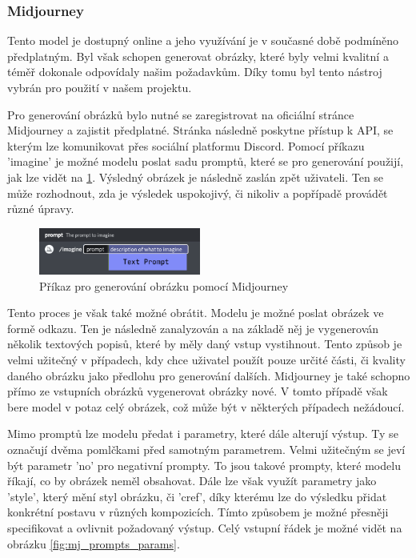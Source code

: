 \subsubsection*{Midjourney}
Tento model je dostupný online a jeho využívání je v současné době podmíněno předplatným. Byl však schopen generovat obrázky, které byly velmi kvalitní a téměř  dokonale odpovídaly našim požadavkům. Díky tomu byl tento nástroj vybrán pro použití v našem projektu.

Pro generování obrázků bylo nutné se zaregistrovat na oficiální stránce Midjourney a zajistit předplatné. Stránka následně poskytne přístup k API, se kterým lze komunikovat přes sociální platformu Discord. Pomocí příkazu 'imagine' je možné modelu poslat sadu promptů, které se pro generování použijí, jak lze vidět na \ref{fig:mj_prompts}. Výsledný obrázek je následně zaslán zpět uživateli. Ten se může rozhodnout, zda je výsledek uspokojivý, či nikoliv a popřípadě provádět různé úpravy.

\begin{figure}[H]
    \centering
    \includegraphics[width=0.475\textwidth]{resources/figures/midjourney_prompts.png}
    \caption{Příkaz pro generování obrázku pomocí Midjourney\cite{midjourney}}
    \label{fig:mj_prompts}
\end{figure}

Tento proces je však také možné obrátit. Modelu je možné poslat obrázek ve formě odkazu. Ten je následně zanalyzován a na základě něj je vygenerován několik textových popisů, které by měly daný vstup vystihnout. Tento způsob je velmi užitečný v případech, kdy chce uživatel použít pouze určité části, či kvality daného obrázku jako předlohu pro generování dalších. Midjourney je také schopno přímo ze vstupních obrázků vygenerovat obrázky nové. V tomto případě však bere model v potaz celý obrázek, což může být v některých případech nežádoucí.

Mimo promptů lze modelu předat i parametry, které dále alterují výstup. Ty se označují dvěma pomlčkami před samotným parametrem. Velmi užitečným se jeví být parametr 'no' pro negativní prompty. To jsou takové prompty, které modelu říkají, co by obrázek neměl obsahovat. Dále lze však využít parametry jako 'style', který mění styl obrázku, či 'cref', díky kterému lze do výsledku přidat konkrétní postavu v různých kompozicích. Tímto způsobem je možné přesněji specifikovat a ovlivnit požadovaný výstup. Celý vstupní řádek je možné vidět na obrázku \ref{fig:mj_prompts_params}.

